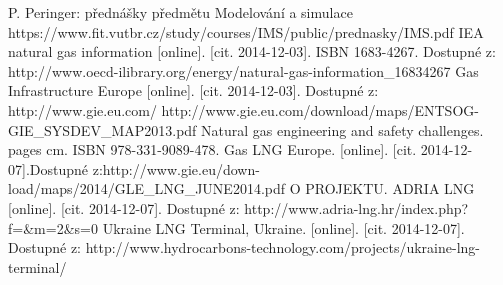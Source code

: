 \documentclass[a4paper,11pt]{article}
\begin{document}
\newpage
\renewcommand{\refname}{Literatura a použité zdroje}
\begin{thebibliography}{99}
P. Peringer: přednášky předmětu Modelování a simulace
https://www.fit.vutbr.cz/study/courses/IMS/public/prednasky/IMS.pdf	
 IEA natural gas information [online]. [cit. 2014-12-03]. ISBN 1683-4267. Dostupné z: http://www.oecd-ilibrary.org/energy/natural-gas-information{\_}16834267
 Gas Infrastructure Europe [online]. [cit. 2014-12-03]. Dostupné z: http://www.gie.eu.com/
 http://www.gie.eu.com/download/maps/ENTSOG-GIE{\_}SYSDEV{\_}MAP2013.pdf
 Natural gas engineering and safety challenges. pages cm. ISBN 978-331-9089-478.
Gas LNG Europe. [online]. [cit. 2014-12-07].Dostupné z:http://www.gie.eu/down-
load/maps/2014/GLE{\_}LNG{\_}JUNE2014.pdf
O PROJEKTU. ADRIA LNG [online]. [cit. 2014-12-07]. Dostupné z: http://www.adria-lng.hr/index.php?f={\&}m=2{\&}s=0
Ukraine LNG Terminal, Ukraine. [online]. [cit. 2014-12-07]. Dostupné z: http://www.hydrocarbons-technology.com/projects/ukraine-lng-terminal/
\end{thebibliography}
\end{document}
